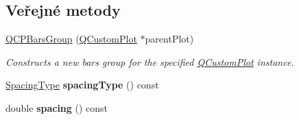 \subsection*{Veřejné metody}
\begin{DoxyCompactItemize}
\item 
\hypertarget{classQCPBarsGroup_aa4e043b9a22c6c5ea0f93740aca063e1}{}\hyperlink{classQCPBarsGroup_aa4e043b9a22c6c5ea0f93740aca063e1}{Q\+C\+P\+Bars\+Group} (\hyperlink{classQCustomPlot}{Q\+Custom\+Plot} $\ast$parent\+Plot)\label{classQCPBarsGroup_aa4e043b9a22c6c5ea0f93740aca063e1}

\begin{DoxyCompactList}\small\item\em Constructs a new bars group for the specified \hyperlink{classQCustomPlot}{Q\+Custom\+Plot} instance. \end{DoxyCompactList}\item 
\hypertarget{classQCPBarsGroup_a1bb562f669d47bd7d3cdd2da1f7d8f00}{}\hyperlink{classQCPBarsGroup_a4c0521120a97e60bbca37677a37075b6}{Spacing\+Type} {\bfseries spacing\+Type} () const \label{classQCPBarsGroup_a1bb562f669d47bd7d3cdd2da1f7d8f00}

\item 
\hypertarget{classQCPBarsGroup_a730bffefcac6c97aaf60e6f64dd3bcd9}{}double {\bfseries spacing} () const \label{classQCPBarsGroup_a730bffefcac6c97aaf60e6f64dd3bcd9}


\end{DoxyCompactItemize}
